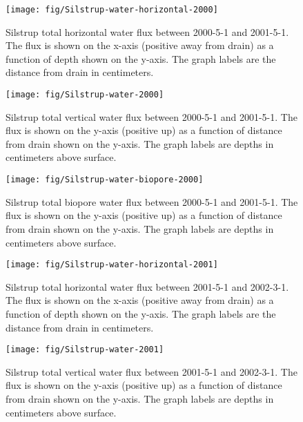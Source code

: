 \begin{figure}[htbp]
  \centering
  \texttt{[image: fig/Silstrup-water-horizontal-2000]}
  
  \caption{Silstrup total horizontal water flux between 2000-5-1 and
    2001-5-1.  The flux is shown on the x-axis (positive away from
    drain) as a function of depth shown on the y-axis.  The graph
    labels are the distance from drain in centimeters.}
  \label{fig:Silstrup-water-2000-horizontal}
\end{figure}\FloatBarrier

\begin{figure}[htbp]
  \centering
  \texttt{[image: fig/Silstrup-water-2000]}
  
  \caption{Silstrup total vertical water flux between 2000-5-1 and
    2001-5-1.  The flux is shown on the y-axis (positive up) as a
    function of distance from drain shown on the y-axis.  The graph
    labels are depths in centimeters above surface.}
  \label{fig:Silstrup-water-2000}
\end{figure}\FloatBarrier

\begin{figure}[htbp]
  \centering
  \texttt{[image: fig/Silstrup-water-biopore-2000]}
  
  \caption{Silstrup total biopore water flux between 2000-5-1 and
    2001-5-1.  The flux is shown on the y-axis (positive up) as a
    function of distance from drain shown on the y-axis.  The graph
    labels are depths in centimeters above surface.}
  \label{fig:Silstrup-water-biopore-2000}
\end{figure}\FloatBarrier

\begin{figure}[htbp]
  \centering
  \texttt{[image: fig/Silstrup-water-horizontal-2001]}
  
  \caption{Silstrup total horizontal water flux between 2001-5-1 and
    2002-3-1.  The flux is shown on the x-axis (positive away from
    drain) as a function of depth shown on the y-axis.  The graph
    labels are the distance from drain in centimeters.}
  \label{fig:Silstrup-water-2001-horizontal}
\end{figure}\FloatBarrier

\begin{figure}[htbp]
  \centering
  \texttt{[image: fig/Silstrup-water-2001]}
  
  \caption{Silstrup total vertical water flux between 2001-5-1 and
    2002-3-1.  The flux is shown on the y-axis (positive up) as a
    function of distance from drain shown on the y-axis.  The graph
    labels are depths in centimeters above surface.}
  \label{fig:Silstrup-water-2001}
\end{figure}\FloatBarrier

